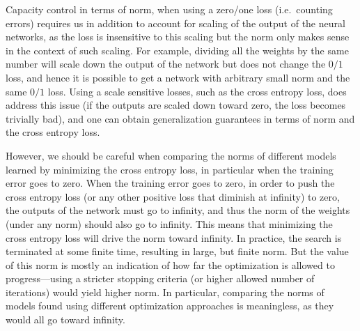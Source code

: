 \documentclass{article}
\begin{document}

Capacity control in terms of norm, when using a zero/one loss
(i.e.~counting errors) requires us in addition to account for scaling
of the output of the neural networks, as the loss is insensitive to
this scaling but the norm only makes sense in the context of such
scaling.  For example, dividing all the weights by the same number will
scale down the output of the network but does not change the $0/1$
loss, and hence it is possible to get a network with arbitrary small
norm and the same $0/1$ loss.  Using a scale sensitive losses, such as the
cross entropy loss, does address this issue (if the outputs are scaled
down toward zero, the loss becomes trivially bad), and one can obtain
generalization guarantees in terms of norm and the cross entropy loss.

However, we should be careful when comparing the norms of different
models learned by minimizing the cross entropy loss, in particular
when the training error goes to zero.  When the training error goes to
zero, in order to push the cross entropy loss (or any other positive
loss that diminish at infinity) to zero, the outputs of the network
must go to infinity, and thus the norm of the weights (under any
norm) should also go to infinity.  This means that minimizing the
cross entropy loss will drive the norm toward infinity.  In practice,
the search is terminated at some finite time, resulting in large, but
finite norm.  But the value of this norm is mostly an indication of
how far the optimization is allowed to progress---using a stricter
stopping criteria (or higher allowed number of iterations) would yield
higher norm.  In particular, comparing the norms of models found using
different optimization approaches is meaningless, as they would all go
toward infinity.
\end{document}
